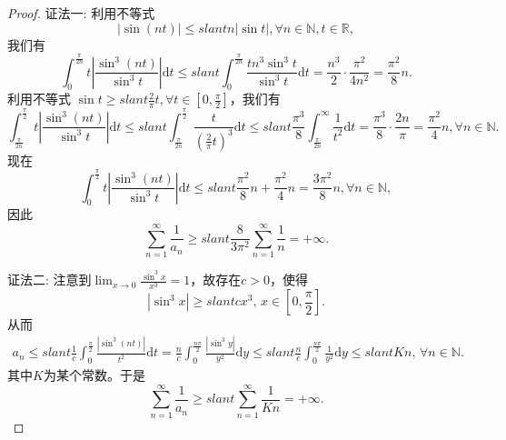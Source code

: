\documentclass[../../main.tex]{subfiles}
\begin{document}
\begin{proof}
{\color{blue}证法一:}
利用不等式
\[
|\sin (nt)| \leqslant slant n |\sin t|, \forall n \in \mathbb{N}, t \in \mathbb{R},
\]
我们有
\[
\int_{0}^{\frac{\pi}{2n}} t \left| \frac{\sin^3 (nt)}{\sin^3 t} \right| \mathrm{d}t \leqslant slant \int_{0}^{\frac{\pi}{2n}} \frac{t n^3 \sin^3 t}{\sin^3 t} \mathrm{d}t = \frac{n^3}{2} \cdot \frac{\pi^2}{4n^2} = \frac{\pi^2}{8} n.
\]
利用不等式 \( \sin t \geqslant slant \frac{2}{\pi} t, \forall t \in \left[ 0, \frac{\pi}{2} \right] \)，我们有
\[
\int_{\frac{\pi}{2n}}^{\frac{\pi}{2}} t \left| \frac{\sin^3 (nt)}{\sin^3 t} \right| \mathrm{d}t \leqslant slant \int_{\frac{\pi}{2n}}^{\frac{\pi}{2}} \frac{t}{\left( \frac{2}{\pi} t \right)^3} \mathrm{d}t \leqslant slant \frac{\pi^3}{8} \int_{\frac{\pi}{2n}}^{\infty} \frac{1}{t^2} \mathrm{d}t = \frac{\pi^3}{8} \cdot \frac{2n}{\pi} = \frac{\pi^2}{4} n, \forall n \in \mathbb{N}.
\]
现在
\[
\int_{0}^{\frac{\pi}{2}} t \left| \frac{\sin^3 (nt)}{\sin^3 t} \right| \mathrm{d}t \leqslant slant \frac{\pi^2}{8} n + \frac{\pi^2}{4} n = \frac{3\pi^2}{8} n, \forall n \in \mathbb{N},
\]
因此
\[
\sum_{n = 1}^{\infty} \frac{1}{a_n} \geqslant slant \frac{8}{3\pi^2} \sum_{n = 1}^{\infty} \frac{1}{n} = +\infty.
\]

{\color{blue}证法二:}
注意到$\lim_{x\rightarrow 0}\frac{\sin ^3x}{x^3}=1$，故存在$c>0$，使得
\[
|\sin^3 x| \geqslant slant c x^3, \, x \in \left[ 0, \frac{\pi}{2} \right].
\]
从而
\begin{align*}
a_n \leqslant slant \frac{1}{c} \int_0^{\frac{\pi}{2}} \frac{|\sin^3 (nt)|}{t^2} \mathrm{d}t = \frac{n}{c} \int_0^{\frac{n\pi}{2}} \frac{|\sin^3 y|}{y^2} \mathrm{d}y \leqslant slant \frac{n}{c} \int_0^{\frac{n\pi}{2}} \frac{1}{y^2} \mathrm{d}y \leqslant slant Kn, \, \forall n \in \mathbb{N}.
\end{align*}
其中$K$为某个常数。于是
\[
\sum_{n=1}^{\infty} \frac{1}{a_n} \geqslant slant \sum_{n=1}^{\infty} \frac{1}{Kn} = +\infty.
\]
\end{proof}
\end{document}
